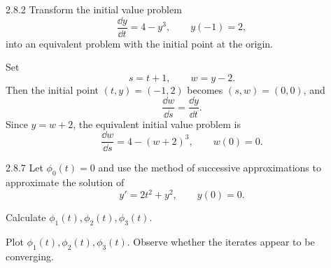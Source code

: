 \documentclass[11pt,oneside]{article}
\begin{document}
\begin{problem}{2.8.2}
Transform the initial value problem
\[
    \frac{\dd y}{\dd t}=4-y^3,
    \qquad
    y(-1)=2,
\]
into an equivalent problem with the initial point at the origin.
\end{problem}

\begin{solution}
Set
\[
    s=t+1,
    \qquad
    w=y-2.
\]
Then the initial point $(t,y)=(-1,2)$ becomes $(s,w)=(0,0)$, and
\[
    \frac{\dd w}{\dd s}=\frac{\dd y}{\dd t}.
\]
Since $y=w+2$, the equivalent initial value problem is
\[
    \boxed{
        \frac{\dd w}{\dd s}=4-(w+2)^3,
        \qquad
        w(0)=0
    }.
\]
\end{solution}

\begin{problem}{2.8.7}
Let $\phi_0(t)=0$ and use the method of successive approximations to approximate the solution of
\[
    y'=2t^2+y^2,
    \qquad
    y(0)=0.
\]
\begin{problemsubparts}
    \item Calculate $\phi_1(t),\phi_2(t),\phi_3(t)$.
    \item Plot $\phi_1(t),\phi_2(t),\phi_3(t)$. Observe whether the iterates appear to be converging.
\end{problemsubparts}
\end{problem}
\end{document}
